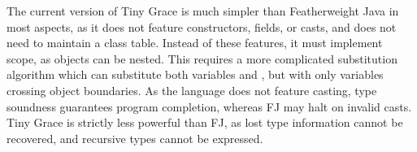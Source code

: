 \noindent The current version of Tiny Grace is much simpler than Featherweight
Java in most aspects, as it does not feature constructors, fields, or casts, and
does not need to maintain a class table.  Instead of these features, it must
implement scope, as objects can be nested.  This requires a more complicated
substitution algorithm which can substitute both variables and \self, but with
only variables crossing object boundaries.  As the language does not feature
casting, type soundness guarantees program completion, whereas FJ may halt on
invalid casts.  Tiny Grace is strictly less powerful than FJ, as lost type
information cannot be recovered, and recursive types cannot be expressed.

